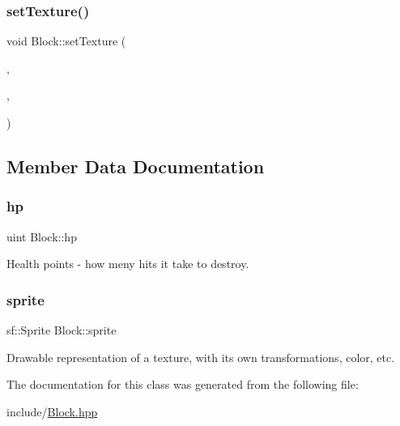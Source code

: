 \subsubsection{\texorpdfstring{setTexture()}{setTexture()}\hspace{0.1cm}{\footnotesize\ttfamily [2/2]}}
{\footnotesize\ttfamily void Block\+::set\+Texture (\begin{DoxyParamCaption}\item[{\mbox{\hyperlink{class_game_engine}{Game\+Engine}} $\ast$}]{,  }\item[{std\+::string}]{,  }\item[{sf\+::\+Int\+Rect}]{ }\end{DoxyParamCaption})}



\subsection{Member Data Documentation}
\mbox{\label{class_block_a8b1d6db0268d1e54f55c8824cbb429f2}} 
\subsubsection{\texorpdfstring{hp}{hp}}
{\footnotesize\ttfamily uint Block\+::hp\hspace{0.3cm}{\ttfamily [private]}}



Health points -\/ how meny hits it take to destroy. 

\mbox{\label{class_block_a0fb8279435ff1a353df3170f26428bff}} 
\subsubsection{\texorpdfstring{sprite}{sprite}}
{\footnotesize\ttfamily sf\+::\+Sprite Block\+::sprite\hspace{0.3cm}{\ttfamily [private]}}



Drawable representation of a texture, with its own transformations, color, etc. 



The documentation for this class was generated from the following file\+:\begin{DoxyCompactItemize}
\item 
include/\mbox{\hyperlink{_block_8hpp}{Block.\+hpp}}\end{DoxyCompactItemize}
